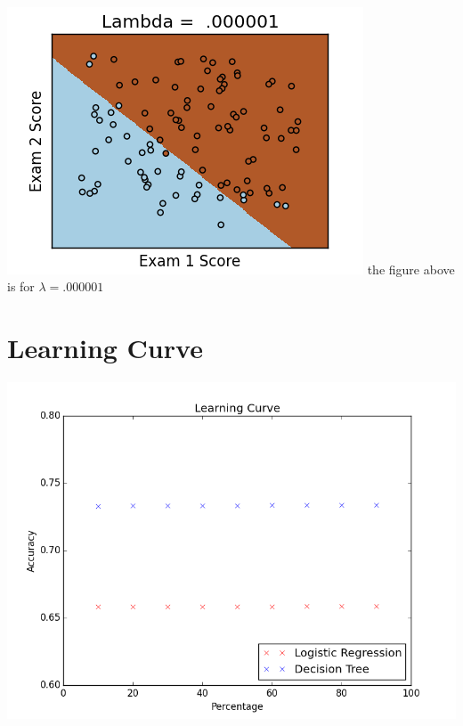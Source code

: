 \documentclass{article}
\begin{document}
\paragraph{}
\includegraphics[width = \linewidth]{Lambda_000001.png}
the figure above is for $ \lambda = .000001$ 
\paragraph{}

 

\section{Learning Curve}
\includegraphics[width =\linewidth]{learningcurve.png}
\end{document}
